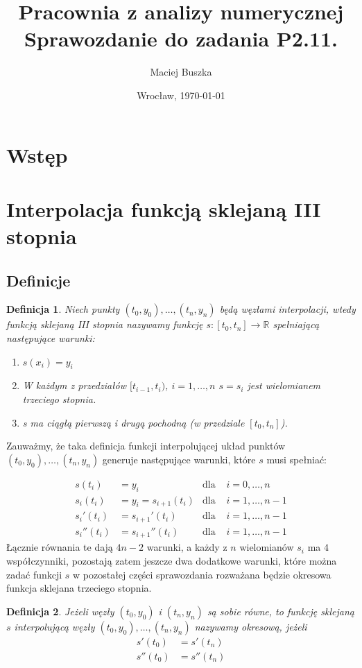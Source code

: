 \documentclass[11pt,wide]{mwart}
\date{Wrocław, \today}
\title{\LARGE\textbf{Pracownia z analizy numerycznej}
  \\Sprawozdanie do zadania \textbf{P2.11.}}
\author{Maciej Buszka}
\newtheorem{defn}{Definicja}
\begin{document}
\maketitle
\thispagestyle{empty}
\tableofcontents

\section{Wstęp}
\section{Interpolacja funkcją sklejaną III stopnia}

\subsection{Definicje}

\begin{defn}

Niech punkty $ (t_0, y_0) , \ldots, (t_n, y_n) $ będą węzłami interpolacji, wtedy funkcją sklejaną III stopnia nazywamy funkcję $ s: [t_0, t_n] \rightarrow \mathbb{R} $ spełniającą następujące warunki:
\begin{enumerate}
\item $ s(x_i) = y_i $
\item W każdym z przedziałów $ [t_{i-1}, t_i ) $, $ i = 1, \ldots, n $ $ s = s_i $  jest wielomianem trzeciego stopnia.
\item s ma ciągłą pierwszą i drugą pochodną (w przedziale $ [t_0, t_n] $).
\end{enumerate}

\end{defn}

Zauważmy, że taka definicja funkcji interpolującej układ punktów $ (t_0, y_0) , \ldots, (t_n, y_n) $ generuje następujące warunki, które $ s $ musi spełniać:

\begin{align}
	s(t_i) &= y_i               		&\text{dla }& i = 0, \ldots, n \\
	s_i(t_{i}) &= y_i = s_{i+1}(t_{i}) 	&\text{dla }& i = 1, \ldots, n-1 \label{eq:scont}\\
	s_i'(t_{i}) &= s_{i+1}'(t_i) 		&\text{dla }& i = 1, \ldots, n-1 \label{eq:dscont}\\
	s_i''(t_{i}) &= s_{i+1}''(t_i) 	    &\text{dla }& i = 1, \ldots, n-1 \label{eq:ddscont}
\end{align}
Łącznie równania te dają $ 4n - 2 $ warunki, a każdy z $ n $ wielomianów $ s_i $ ma $ 4 $ współczynniki, pozostają zatem jeszcze dwa dodatkowe warunki, które można zadać funkcji $ s $ w pozostałej części sprawozdania rozważana będzie okresowa funkcja sklejana trzeciego stopnia.
\begin{defn} Jeżeli węzły $ (t_0, y_0) $ i $ (t_n, y_n) $ są sobie równe, to funkcję sklejaną $ s $ interpolującą węzły $ (t_0, y_0) , \ldots, (t_n, y_n) $ nazywamy okresową, jeżeli
\begin{align}
s'(t_0) &= s'(t_n) \\
s''(t_0) &= s''(t_n)
\end{align}
\end{defn}
\end{document}
